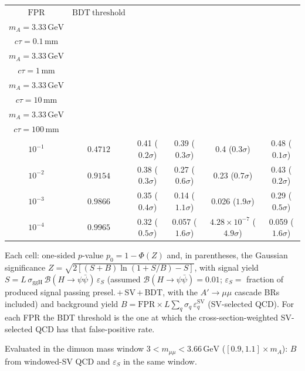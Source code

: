 \documentclass[10pt,a4paper]{article}
\begin{document}
{\begin{tabular}{cccccc}
\toprule
$\mathrm{FPR}$ & $\mathrm{BDT\ threshold}$ & \shortstack{$m_{\pi}=10\,\mathrm{GeV}$\\$m_{A}=3.33\,\mathrm{GeV}$\\$c\tau=0.1\,\mathrm{mm}$} & \shortstack{$m_{\pi}=10\,\mathrm{GeV}$\\$m_{A}=3.33\,\mathrm{GeV}$\\$c\tau=1\,\mathrm{mm}$} & \shortstack{$m_{\pi}=10\,\mathrm{GeV}$\\$m_{A}=3.33\,\mathrm{GeV}$\\$c\tau=10\,\mathrm{mm}$} & \shortstack{$m_{\pi}=10\,\mathrm{GeV}$\\$m_{A}=3.33\,\mathrm{GeV}$\\$c\tau=100\,\mathrm{mm}$} \\
\midrule
$10^{-1}$ & $0.4712$ & 0.41 ($0.2\sigma$) & 0.39 ($0.3\sigma$) & 0.4 ($0.3\sigma$) & 0.48 ($0.1\sigma$)\\
$10^{-2}$ & $0.9154$ & 0.38 ($0.3\sigma$) & 0.27 ($0.6\sigma$) & 0.23 ($0.7\sigma$) & 0.43 ($0.2\sigma$)\\
$10^{-3}$ & $0.9866$ & 0.35 ($0.4\sigma$) & 0.14 ($1.1\sigma$) & 0.026 ($1.9\sigma$) & 0.29 ($0.5\sigma$)\\
$10^{-4}$ & $0.9965$ & 0.32 ($0.5\sigma$) & 0.057 ($1.6\sigma$) & $4.28\times10^{-7}$ ($4.9\sigma$) & 0.059 ($1.6\sigma$)\\
\bottomrule
\end{tabular}

{\small Each cell: one-sided $p$-value $p_0=1-\Phi(Z)$ and, in parentheses, the Gaussian significance $Z=\sqrt{2\left[(S{+}B)\ln(1{+}S/B)-S\right]}$, with signal yield $S=L\,\sigma_{\mathrm{ggH}}\,\mathcal{B}(H\to\psi\bar{\psi})\,\varepsilon_S$ (assumed $\mathcal{B}(H\to\psi\bar{\psi})=0.01$; $\varepsilon_S=$ fraction of produced signal passing presel.\,$+$\,SV\,$+$\,BDT, with the $A'\to\mu\mu$ cascade BRs included) and background yield $B=\mathrm{FPR}\times L\sum_q\sigma_q\,\varepsilon_q^{\mathrm{SV}}$ (SV-selected QCD). For each FPR the BDT threshold is the one at which the cross-section-weighted SV-selected QCD has that false-positive rate.}

{\small Evaluated in the dimuon mass window $3<m_{\mu\mu}<3.66\,\mathrm{GeV}$ ($[0.9,1.1]\times m_A$): $B$ from windowed-SV QCD and $\varepsilon_S$ in the same window.}

}\clearpage
\end{document}
